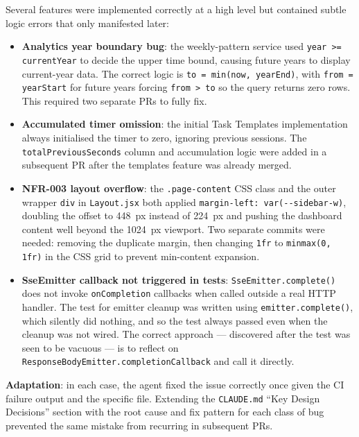 \documentclass[a4paper, 12pt]{article}
\begin{document}
Several features were implemented correctly at a high level but contained subtle logic errors
that only manifested later:

\begin{itemize}
  \item \textbf{Analytics year boundary bug}: the weekly-pattern service used
        \texttt{year >= currentYear} to decide the upper time bound, causing future years to
        display current-year data. The correct logic is \texttt{to = min(now, yearEnd)}, with
        \texttt{from = yearStart} for future years forcing \texttt{from > to} so the query
        returns zero rows. This required two separate PRs to fully fix.

  \item \textbf{Accumulated timer omission}: the initial Task Templates implementation always
        initialised the timer to zero, ignoring previous sessions. The
        \texttt{totalPreviousSeconds} column and accumulation logic were added in a subsequent
        PR after the templates feature was already merged.

  \item \textbf{NFR-003 layout overflow}: the \texttt{.page-content} CSS class and the outer
        wrapper \texttt{div} in \texttt{Layout.jsx} both applied \texttt{margin-left:
        var(-{}-sidebar-w)}, doubling the offset to 448~px instead of 224~px and pushing the
        dashboard content well beyond the 1024~px viewport. Two separate commits were needed:
        removing the duplicate margin, then changing \texttt{1fr} to \texttt{minmax(0, 1fr)}
        in the CSS grid to prevent min-content expansion.

  \item \textbf{SseEmitter callback not triggered in tests}: \texttt{SseEmitter.complete()}
        does not invoke \texttt{onCompletion} callbacks when called outside a real HTTP
        handler. The test for emitter cleanup was written using \texttt{emitter.complete()},
        which silently did nothing, and so the test always passed even when the cleanup was
        not wired. The correct approach --- discovered after the test was seen to be vacuous
        --- is to reflect on \texttt{ResponseBodyEmitter.completionCallback} and call it
        directly.
\end{itemize}

\textbf{Adaptation}: in each case, the agent fixed the issue correctly once given the CI
failure output and the specific file. Extending the \texttt{CLAUDE.md} ``Key Design
Decisions'' section with the root cause and fix pattern for each class of bug prevented the
same mistake from recurring in subsequent PRs.
\end{document}
